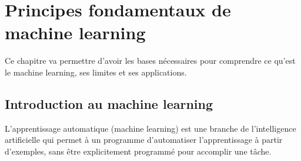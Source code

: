 \chapter{Principes fondamentaux de machine learning}

\par{Ce chapitre va permettre d’avoir les bases nécessaires pour comprendre ce qu’est le machine learning, ses limites et ses applications.}


\section{Introduction au machine learning}

\par{L'apprentissage automatique (machine learning) est une branche de l'intelligence artificielle qui permet à un programme d'automatiser l'apprentissage à partir d'exemples, sans être explicitement programmé pour accomplir une tâche.}

